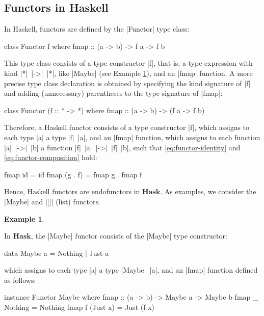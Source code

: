 \documentclass[11pt,letterpaper]{article}
\theoremstyle{definition}
\newtheorem{example}{Example}[section]
\newcommand{\catbf}[1]{\ensuremath{\mathbf{#1}}\xspace}
\newcommand{\hask}{\catbf{Hask}}
\begin{document}
\subsection{Functors in Haskell}
\label{sec:functors-haskell}

In Haskell, functors are defined by the |Functor| type class:
\begin{code}
class Functor f where
  fmap :: (a -> b) -> f a -> f b
\end{code}
This type class consists of a type constructor |f|, that is, a type
expression with kind |*|~|->|~|*|, like |Maybe| (see Example
\ref{ex:functor-maybe}), and an |fmap| function. A more precise type
class declaration is obtained by specifying the kind signature of |f|
and adding (unnecessary) parentheses to the type signature of |fmap|:
\begin{code}
class Functor (f :: * -> *) where
  fmap :: (a -> b) -> (f a -> f b)
\end{code}

Therefore, a Haskell functor consists of a type constructor |f|, which
assigns to each type |a| a type |f|~|a|, and an |fmap| function, which
assigns to each function |a|~|->|~|b| a function |f|~|a|~|->|~|f|~|b|,
such that \eqref{eq:functor-identity} and
\eqref{eq:functor-composition} hold:
\begin{code}
fmap id      = id
fmap (g . f) = fmap g . fmap f
\end{code}

Hence, Haskell functors are endofunctors in \hask. As examples, we
consider the |Maybe| and |[]| (list) functors.

\begin{example}
  \label{ex:functor-maybe}


  In \hask, the |Maybe| functor consists of the |Maybe| type
  constructor:
  \begin{code}
data Maybe a = Nothing | Just a
  \end{code}
  which assigns to each type |a| a type |Maybe|~|a|, and an |fmap|
  function defined as follows:
  \begin{code}
instance Functor Maybe where
  fmap :: (a -> b) -> Maybe a -> Maybe b
  fmap _ Nothing  = Nothing
  fmap f (Just x) = Just (f x)
  \end{code}

\end{example}
\end{document}
